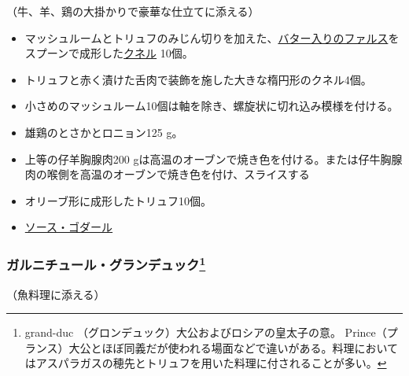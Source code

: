 \begin{recette}


（牛、羊、鶏の大掛かりで豪華な仕立てに添える）

\begin{itemize}
\item
  マッシュルームとトリュフのみじん切りを加えた、\protect\hyperlink{farce-a}{バター入りのファルス}をスプーンで成形した\protect\hyperlink{quenelles-diverses}{クネル}
  10個。
\item
  トリュフと赤く漬けた舌肉で装飾を施した大きな楕円形のクネル4個。
\item
  小さめのマッシュルーム10個は軸を除き、螺旋状に切れ込み模様を付ける。
\item
  雄鶏のとさかとロニョン125 g。
\item
  上等の仔羊胸腺肉200
  gは高温のオーブンで焼き色を付ける。または仔牛胸腺肉の喉側を高温のオーブンで焼き色を付け、スライスする
\item
  オリーブ形に成形したトリュフ10個。
\item
  \protect\hyperlink{sauce-godard}{ソース・ゴダール}
\end{itemize}

\atoaki{}

\hypertarget{garniture-grand-duc}{%
\subsubsection[ガルニチュール・グランデュック]{\texorpdfstring{ガルニチュール・グランデュック\footnote{grand-duc
  （グロンデュック）大公およびロシアの皇太子の意。
  Prince（プランス）大公とほぼ同義だが使われる場面などで違いがある。料理においてはアスパラガスの穂先とトリュフを用いた料理に付されることが多い。}}{ガルニチュール・グランデュック}}\label{garniture-grand-duc}}



（魚料理に添える）


\end{recette}
